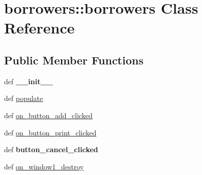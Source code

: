 \hypertarget{classborrowers_1_1borrowers}{
\section{borrowers::borrowers Class Reference}
\label{classborrowers_1_1borrowers}
}
\subsection*{Public Member Functions}
\begin{DoxyCompactItemize}
\item 
\hypertarget{classborrowers_1_1borrowers_a3479ee4f66393d9d9b3d775a57052f1e}{
def {\bfseries \_\-\_\-init\_\-\_\-}}
\label{classborrowers_1_1borrowers_a3479ee4f66393d9d9b3d775a57052f1e}

\item 
def \hyperlink{classborrowers_1_1borrowers_a18100648193c523f0087a413ae7aa250}{populate}
\item 
def \hyperlink{classborrowers_1_1borrowers_aabf0b5a5ebda30b6302f89fa5595f2fa}{on\_\-button\_\-add\_\-clicked}
\item 
def \hyperlink{classborrowers_1_1borrowers_a1403999a88a574126ab61d290bf3fee3}{on\_\-button\_\-print\_\-clicked}
\item 
\hypertarget{classborrowers_1_1borrowers_a5ec24faad2e348ed2df4b50a71bf8cc6}{
def {\bfseries button\_\-cancel\_\-clicked}}
\label{classborrowers_1_1borrowers_a5ec24faad2e348ed2df4b50a71bf8cc6}

\item 
def \hyperlink{classborrowers_1_1borrowers_a55ca1ad181487a703556bf252d170e26}{on\_\-window1\_\-destroy}
\end{DoxyCompactItemize}
